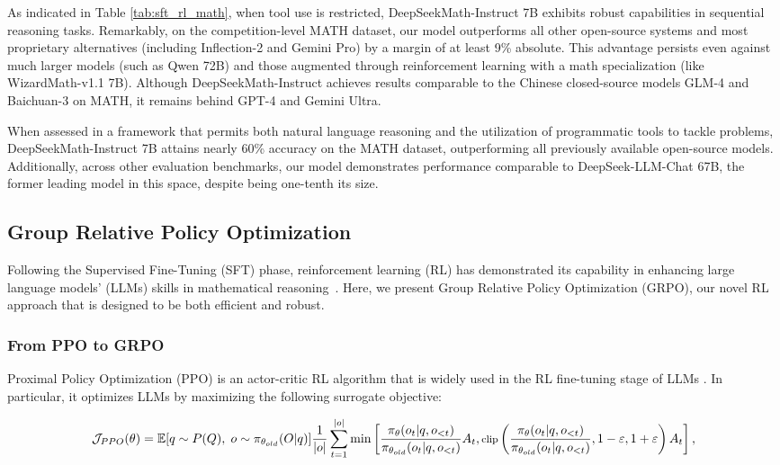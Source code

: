 \begin{itemize}[topsep=0pt]
\begin{itemize}[topsep=0pt]
As indicated in Table \ref{tab:sft_rl_math}, when tool use is restricted, DeepSeekMath-Instruct 7B exhibits robust capabilities in sequential reasoning tasks. Remarkably, on the competition-level MATH dataset, our model outperforms all other open-source systems and most proprietary alternatives (including Inflection-2 and Gemini Pro) by a margin of at least 9\% absolute. This advantage persists even against much larger models (such as Qwen 72B) and those augmented through reinforcement learning with a math specialization (like WizardMath-v1.1 7B). Although DeepSeekMath-Instruct achieves results comparable to the Chinese closed-source models GLM-4 and Baichuan-3 on MATH, it remains behind GPT-4 and Gemini Ultra.

When assessed in a framework that permits both natural language reasoning and the utilization of programmatic tools to tackle problems, DeepSeekMath-Instruct 7B attains nearly 60\% accuracy on the MATH dataset, outperforming all previously available open-source models. Additionally, across other evaluation benchmarks, our model demonstrates performance comparable to DeepSeek-LLM-Chat 67B, the former leading model in this space, despite being one-tenth its size.

\subsection{Group Relative Policy Optimization} Following the Supervised Fine-Tuning (SFT) phase, reinforcement learning (RL) has demonstrated its capability in enhancing large language models' (LLMs) skills in mathematical reasoning~\citep{wang2023math,wizardmath}. Here, we present Group Relative Policy Optimization (GRPO), our novel RL approach that is designed to be both efficient and robust.

\subsubsection{From PPO to GRPO} Proximal Policy Optimization (PPO) \citep{schulman2017proximal} is an actor-critic RL algorithm that is widely used in the RL fine-tuning stage of LLMs \citep{ouyang2022training}. In particular, it optimizes LLMs by maximizing the following surrogate objective:

\begin{equation}
\footnotesize
    \mathcal{J}_{PPO}(\theta) = \mathbb{E}{[q \sim P(Q),\ o \sim \pi_{\theta_{old}}(O|q)]} \frac{1}{|o|} \sum_{t=1}^{|o|} \min \left[ \frac{\pi_\theta(o_{t} | q, o_{<t})}{\pi_{\theta_{old}}(o_{t} | q, o_{<t})} A_{t}, \text{clip} \left( \frac{\pi_\theta(o_{t} | q, o_{<t})}{\pi_{\theta_{old}}(o_{t} | q, o_{<t})}, 1 - \varepsilon, 1 + \varepsilon \right)  A_{t} \right] ,
\end{equation}


\end{itemize}
\end{itemize}
